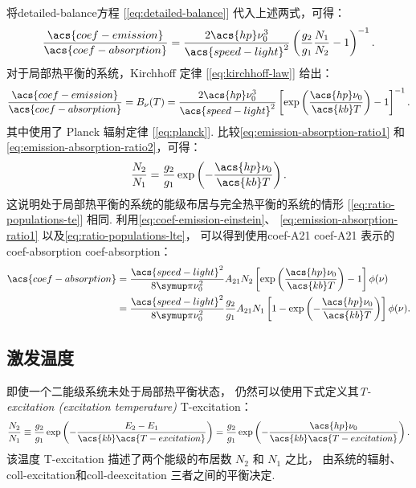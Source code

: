 将\ac{detailed-balance}方程 [\autoref{eq:detailed-balance}]
代入上述两式，可得：
\begin{equation}
  \label{eq:emission-absorption-ratio1}
  \frac{\acs{coef-emission}}{\acs{coef-absorption}}
    = \frac{2 \acs{hp} \nu_0^3}{\acs{speed-light}^2}
      \left( \frac{g_2}{g_1} \frac{N_1}{N_2} - 1 \right)^{-1} .
\end{equation}
对于局部热平衡的系统，Kirchhoff 定律 [\autoref{eq:kirchhoff-law}] 给出：
\begin{equation}
  \label{eq:emission-absorption-ratio2}
  \frac{\acs{coef-emission}}{\acs{coef-absorption}}
    = B_{\nu}(T)
    = \frac{2 \acs{hp} \nu_0^3}{\acs{speed-light}^2} \left[
      \exp\left( \frac{\acs{hp} \nu_0}{\acs{kb} T} \right) - 1 \right]^{-1}.
\end{equation}
其中使用了 Planck 辐射定律 [\autoref{eq:planck}].
比较\autoref{eq:emission-absorption-ratio1}
和\autoref{eq:emission-absorption-ratio2}，可得：
\begin{equation}
  \label{eq:ratio-populations-lte}
  \frac{N_2}{N_1}
    = \frac{g_2}{g_1} \exp\left( -\frac{\acs{hp} \nu_0}{\acs{kb} T} \right) .
\end{equation}
这说明处于局部热平衡的系统的能级布居与完全热平衡的系统的情形
[\autoref{eq:ratio-populations-te}] 相同.
利用\autoref{eq:coef-emission-einstein}、
\autoref{eq:emission-absorption-ratio1}
以及\autoref{eq:ratio-populations-lte}，
可以得到使用\acl{coef-A21} \ac{coef-A21}
表示的\acl{coef-absorption} \acs{coef-absorption}：
\begin{align}
  \acs{coef-absorption}
    & = \frac{\acs{speed-light}^2}{8\Cpi \nu_0^2} A_{21} N_2
      \left[ \exp\left( \frac{\acs{hp} \nu_0}{\acs{kb} T} \right) - 1 \right]
      \phi(\nu)
    \label{eq:coef-absorption-einstein2} \\
    & = \frac{\acs{speed-light}^2}{8\Cpi \nu_0^2} \frac{g_2}{g_1} A_{21} N_1
      \left[ 1 - \exp\left( -\frac{\acs{hp} \nu_0}{\acs{kb} T} \right) \right]
      \phi(\nu) .
    \label{eq:coef-absorption-einstein3}
\end{align}

\subsection{激发温度}

即使一个二能级系统未处于局部热平衡状态，
仍然可以使用下式定义其\emph{\acl{T-excitation} (excitation temperature)}
\ac{T-excitation}：
\begin{equation}
  \label{eq:t-excitation-def}
  \frac{N_2}{N_1} \equiv \frac{g_2}{g_1}
    \exp\left(- \frac{E_2-E_1}{\acs{kb} \acs{T-excitation}} \right)
    = \frac{g_2}{g_1}
      \exp\left( -\frac{\acs{hp} \nu_0}{\acs{kb} \acs{T-excitation}} \right) .
\end{equation}
该温度 \acs{T-excitation} 描述了两个能级的布居数 $N_2$ 和 $N_1$ 之比，
由系统的辐射、\ac{coll-excitation}和\ac{coll-deexcitation} 三者之间的平衡决定.


